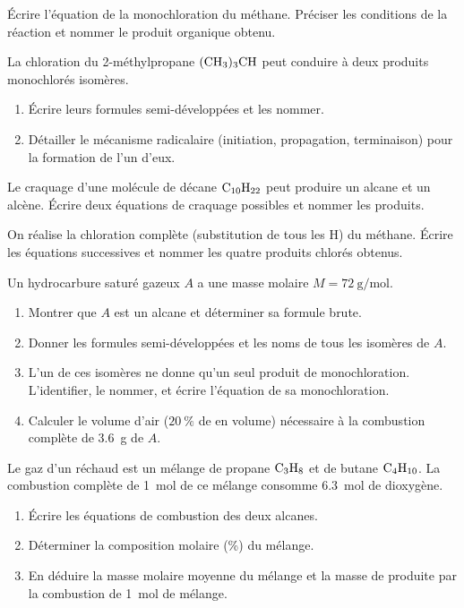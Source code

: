 
\exo{} Écrire l'équation de la monochloration du méthane. Préciser les
conditions de la réaction et nommer le produit organique obtenu.

\exo{} La chloration du 2-méthylpropane $\ce{(CH3)3CH}$ peut conduire à deux
produits monochlorés isomères.
\begin{enumerate}[label=\arabic*)]
\item Écrire leurs formules semi-développées et les nommer.
\item Détailler le mécanisme radicalaire (initiation, propagation, terminaison)
pour la formation de l'un d'eux.
\end{enumerate}

\exo{} Le craquage d'une molécule de décane $\ce{C10H22}$ peut produire un
alcane et un alcène. Écrire deux équations de craquage possibles et nommer les
produits.

\exo{} On réalise la chloration complète (substitution de tous les H) du
méthane. Écrire les équations successives et nommer les quatre produits chlorés obtenus.


Un hydrocarbure saturé gazeux $A$ a une masse molaire $M = \SI{72}{\gram\per\mol}$.
\begin{enumerate}[label=\arabic*)]
\item Montrer que $A$ est un alcane et déterminer sa formule brute.
\item Donner les formules semi-développées et les noms de tous les isomères de $A$.
\item L'un de ces isomères ne donne qu'un seul produit de monochloration.
L'identifier, le nommer, et écrire l'équation de sa monochloration.
\item Calculer le volume d'air ($\SI{20}{\percent}$ de  en volume) nécessaire
à la combustion complète de \SI{3.6}{\gram} de $A$.
\end{enumerate}

Le gaz d'un réchaud est un mélange de propane $\ce{C3H8}$ et de butane $\ce{C4H10}$.
La combustion complète de \SI{1}{\mol} de ce mélange consomme \SI{6.3}{\mol} de
dioxygène.
\begin{enumerate}[label=\arabic*)]
\item Écrire les équations de combustion des deux alcanes.
\item Déterminer la composition molaire (\%) du mélange.
\item En déduire la masse molaire moyenne du mélange et la masse de  produite
par la combustion de \SI{1}{\mol} de mélange.
\end{enumerate}
